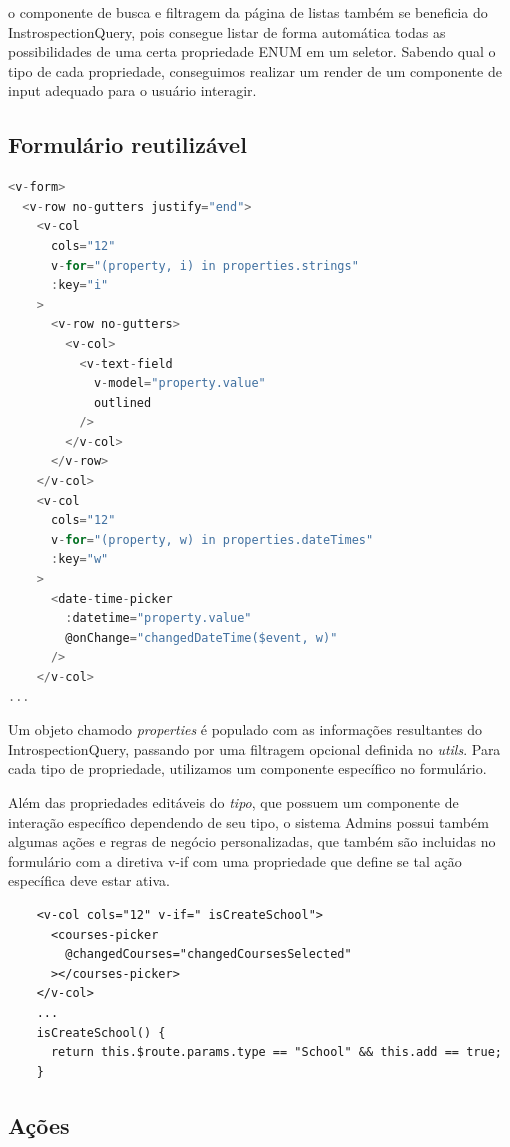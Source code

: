 o componente de busca e filtragem da página de listas também se beneficia do InstrospectionQuery, pois consegue listar de forma automática todas as possibilidades de uma certa propriedade ENUM em um seletor. Sabendo qual o tipo de cada propriedade, conseguimos realizar um render de um componente de input adequado para o usuário interagir.

\subsection{Formulário reutilizável}

\begin{lstlisting}[language=javascript]
<v-form>
  <v-row no-gutters justify="end">
    <v-col
      cols="12"
      v-for="(property, i) in properties.strings"
      :key="i"
    >
      <v-row no-gutters>
        <v-col>
          <v-text-field
            v-model="property.value"
            outlined
          />
        </v-col>
      </v-row>
    </v-col>
    <v-col
      cols="12"
      v-for="(property, w) in properties.dateTimes"
      :key="w"
    >
      <date-time-picker
        :datetime="property.value"
        @onChange="changedDateTime($event, w)"
      />
    </v-col>
...


\end{lstlisting}

Um objeto chamodo \textit{properties} é populado com as informações resultantes do IntrospectionQuery, passando por uma filtragem opcional definida no \textit{utils}. Para cada tipo de propriedade, utilizamos um componente específico no formulário.

Além das propriedades editáveis do \textit{tipo}, que possuem um componente de interação específico dependendo de seu tipo, o sistema Admins possui também algumas ações e regras de negócio personalizadas, que também são incluidas no formulário com a diretiva v-if com uma propriedade que define se tal ação específica deve estar ativa.

\begin{lstlisting}
    <v-col cols="12" v-if=" isCreateSchool">
      <courses-picker
        @changedCourses="changedCoursesSelected"
      ></courses-picker>
    </v-col>
    ...
    isCreateSchool() {
      return this.$route.params.type == "School" && this.add == true;
    }
\end{lstlisting}


\subsection{Ações}

